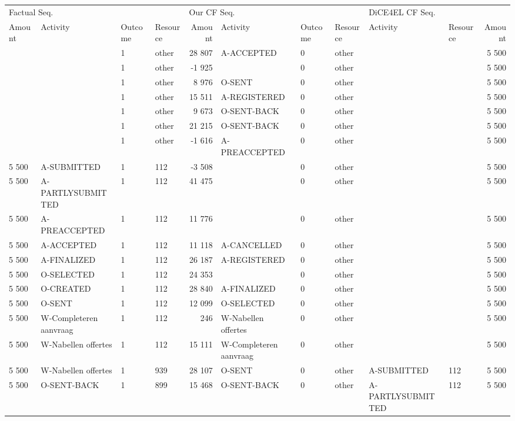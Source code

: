 \begin{tabular}{llllrlllllr}
\toprule
\multicolumn{4}{l}{Factual Seq.} & \multicolumn{4}{l}{Our CF Seq.} & \multicolumn{3}{l}{DiCE4EL CF Seq.} \\
Amount & Activity & Outcome & Resource & Amount & Activity & Outcome & Resource & Activity & Resource & Amount \\
\midrule
 &  & 1 & other & 28 807 & A-ACCEPTED & 0 & other &  &  & 5 500 \\
 &  & 1 & other & -1 925 &  & 0 & other &  &  & 5 500 \\
 &  & 1 & other & 8 976 & O-SENT & 0 & other &  &  & 5 500 \\
 &  & 1 & other & 15 511 & A-REGISTERED & 0 & other &  &  & 5 500 \\
 &  & 1 & other & 9 673 & O-SENT-BACK & 0 & other &  &  & 5 500 \\
 &  & 1 & other & 21 215 & O-SENT-BACK & 0 & other &  &  & 5 500 \\
 &  & 1 & other & -1 616 & A-PREACCEPTED & 0 & other &  &  & 5 500 \\
5 500 & A-SUBMITTED & 1 & 112 & -3 508 &  & 0 & other &  &  & 5 500 \\
5 500 & A-PARTLYSUBMITTED & 1 & 112 & 41 475 &  & 0 & other &  &  & 5 500 \\
5 500 & A-PREACCEPTED & 1 & 112 & 11 776 &  & 0 & other &  &  & 5 500 \\
5 500 & A-ACCEPTED & 1 & 112 & 11 118 & A-CANCELLED & 0 & other &  &  & 5 500 \\
5 500 & A-FINALIZED & 1 & 112 & 26 187 & A-REGISTERED & 0 & other &  &  & 5 500 \\
5 500 & O-SELECTED & 1 & 112 & 24 353 &  & 0 & other &  &  & 5 500 \\
5 500 & O-CREATED & 1 & 112 & 28 840 & A-FINALIZED & 0 & other &  &  & 5 500 \\
5 500 & O-SENT & 1 & 112 & 12 099 & O-SELECTED & 0 & other &  &  & 5 500 \\
5 500 & W-Completeren aanvraag & 1 & 112 & 246 & W-Nabellen offertes & 0 & other &  &  & 5 500 \\
5 500 & W-Nabellen offertes & 1 & 112 & 15 111 & W-Completeren aanvraag & 0 & other &  &  & 5 500 \\
5 500 & W-Nabellen offertes & 1 & 939 & 28 107 & O-SENT & 0 & other & A-SUBMITTED & 112 & 5 500 \\
5 500 & O-SENT-BACK & 1 & 899 & 15 468 & O-SENT-BACK & 0 & other & A-PARTLYSUBMITTED & 112 & 5 500 \\

\end{tabular}

